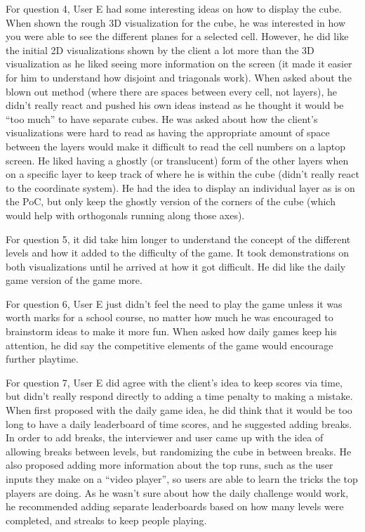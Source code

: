 \documentclass{article}
\begin{document}
For question 4, User E had some interesting ideas on how to display the cube. When shown the rough 3D visualization for the cube, he was interested in how you were able to see the different planes for a selected cell. However, he did like the initial 2D visualizations shown by the client a lot more than the 3D visualization as he liked seeing more information on the screen (it made it easier for him to understand how disjoint and triagonals work). When asked about the blown out method (where there are spaces between every cell, not layers), he didn't really react and pushed his own ideas instead as he thought it would be ``too much'' to have separate cubes. He was asked about how the client's visualizations were hard to read as having the appropriate amount of space between the layers would make it difficult to read the cell numbers on a laptop screen. He liked having a ghostly (or translucent) form of the other layers when on a specific layer to keep track of where he is within the cube (didn't really react to the coordinate system). He had the idea to display an individual layer as is on the PoC, but only keep the ghostly version of the corners of the cube (which would help with orthogonals running along those axes).

For question 5, it did take him longer to understand the concept of the different levels and how it added to the difficulty of the game. It took demonstrations on both visualizations until he arrived at how it got difficult. He did like the daily game version of the game more.

For question 6, User E just didn't feel the need to play the game unless it was worth marks for a school course, no matter how much he was encouraged to brainstorm ideas to make it more fun. When asked how daily games keep his attention, he did say the competitive elements of the game would encourage further playtime.

For question 7, User E did agree with the client's idea to keep scores via time, but didn't really respond directly to adding a time penalty to making a mistake. When first proposed with the daily game idea, he did think that it would be too long to have a daily leaderboard of time scores, and he suggested adding breaks. In order to add breaks, the interviewer and user came up with the idea of allowing breaks between levels, but randomizing the cube in between breaks. He also proposed adding more information about the top runs, such as the user inputs they make on a ``video player'', so users are able to learn the tricks the top players are doing. As he wasn't sure about how the daily challenge would work, he recommended adding separate leaderboards based on how many levels were completed, and streaks to keep people playing.
\end{document}
